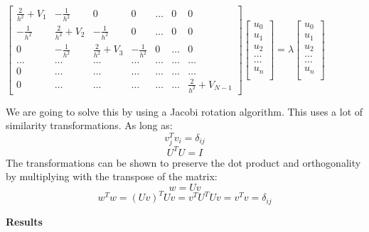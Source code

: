 \documentclass[10pt,a4paper]{article}
\begin{document}
\begin{center}


$
 \begin{bmatrix}
 \frac{2}{h^2}+V_1 & -\frac{1}{h^2} & 0   & 0    & \dots  &0     & 0 \\
 -\frac{1}{h^2} & \frac{2}{h^2}+V_2 & -\frac{1}{h^2} & 0    & \dots  &0     &0 \\
  0   & -\frac{1}{h^2} & \frac{2}{h^2}+V_3 & -\frac{1}{h^2}  &0       &\dots & 0\\
  \dots  & \dots & \dots & \dots  &\dots      &\dots & \dots\\
  0   & \dots & \dots & \dots  &\dots  &\dots & \dots\\
 0   & \dots & \dots & \dots  &\dots       & \dots & \frac{2}{h^2}+V_{N-1}
             \end{bmatrix}
             \begin{bmatrix}
             u_0\\
             u_1\\
             u_2\\
             \dots\\
             \dots\\
             u_n\\
             \end{bmatrix} =\lambda
             \begin{bmatrix}
              u_0\\
             u_1\\
             u_2\\
             \dots\\
             \dots\\
             u_n\\
             \end{bmatrix}
$
\end{center}
We are going to solve this by using a Jacobi rotation algorithm. This uses a lot of similarity transformations. As long as:
$$v_j^Tv_i=\delta_{i j}$$
$$U^TU=I$$
The transformations can be shown to preserve the dot product and orthogonality by multiplying with the transpose of the matrix:
$$w=Uv$$
$$w^Tw=(Uv)^TUv=v^TU^TUv=v^Tv=\delta_{i j}$$






\newpage

\begin{center}
{\LARGE\bf Results}
\end{center}
\end{document}

